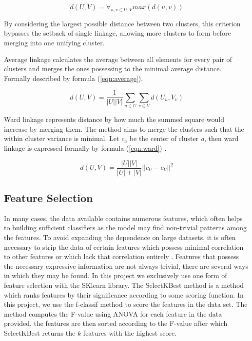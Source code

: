 \begin{equation}
\label{eqn:complete}
d(U, V) = \forall_{u, v \in U, V} max(d(u, v))
\end{equation}

By considering the largest possible distance between two clusters, this criterion bypasses the setback of single linkage, allowing more clusters to form before merging into one unifying cluster.

Average linkage calculates the average between all elements for every pair of clusters and merges the ones possessing to the minimal average distance. Formally described by formula (\ref{eqn:average}).

\begin{equation}
\label{eqn:average}
d(U, V) = \frac{1}{|U||V|}\sum\limits_{u\in U} \sum\limits_{v\in V}  d(U_u, V_v)
\end{equation}

Ward linkage represents distance by how much the summed square would increase by merging them. The method aims to merge the clusters such that the within cluster variance is minimal. Let $c_a$ be the center of cluster \textit{a}, then ward linkage is expressed formally by formula (\ref{eqn:ward}) \cite{shalizi2009distances}.


\begin{equation}
\label{eqn:ward}
d(U, V) = \frac{|U||V|}{|U|+|V|}||c_U - c_V||^2
\end{equation}



\subsection{Feature Selection}

In many cases, the data available contains numerous features, which often helps to building sufficient classifiers as the model may find non-trivial patterns among the features. To avoid expanding the dependence on large datasets, it is often necessary to strip the data of certain features which possess minimal correlation to other features or which lack that correlation entirely \cite{dash1997feature}. Features that possess the necessary expressive information are not always trivial, there are several ways in which they may be found. In this project we exclusively use one form of feature selection with the SKlearn library. The SelectKBest method is a method which ranks features by their significance according to some scoring function. In this project, we use the f-classif method to score the features in the data set. The method computes the F-value using ANOVA for each feature in the data provided, the features are then sorted according to the F-value after which SelectKBest returns the $k$ features with the highest score.


